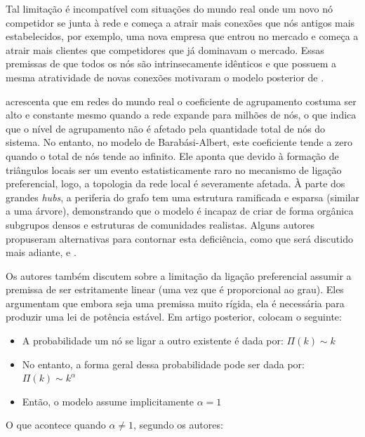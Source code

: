 \documentclass[12pt,oneside,a4paper,brazil,sumario=tradicional]{abntex2}
\begin{document}
Tal limitação é incompatível com situações do mundo real onde um novo nó competidor se junta à rede e começa a atrair mais conexões que nós antigos mais estabelecidos, por exemplo, uma nova empresa que entrou no mercado e começa a atrair mais clientes que competidores que já dominavam o mercado. Essas premissas de que todos os nós são intrinsecamente idênticos e que possuem a mesma atratividade de novas conexões motivaram o modelo posterior de \textcite{bianconi2001}.

\textcite{newman2003} acrescenta que em redes do mundo real o coeficiente de agrupamento costuma ser alto e constante mesmo quando a rede expande para milhões de nós, o que indica que o nível de agrupamento não é afetado pela quantidade total de nós do sistema. No entanto, no modelo de Barabási-Albert, este coeficiente tende a zero quando o total de nós tende ao infinito. Ele aponta que devido à formação de triângulos locais ser um evento estatisticamente raro no mecanismo de ligação preferencial, logo, a topologia da rede local é severamente afetada. À parte dos grandes \textit{hubs}, a periferia do grafo tem uma estrutura ramificada e esparsa (similar a uma árvore), demonstrando que o modelo é incapaz de criar de forma orgânica subgrupos densos e estruturas de comunidades realistas. Alguns autores propuseram alternativas para contornar esta deficiência, como \textcite{holme2002} que será discutido mais adiante, e \textcite{caldarelli2002}.

Os autores também discutem sobre a limitação da ligação preferencial assumir a premissa de ser estritamente linear (uma vez que é proporcional ao grau). Eles argumentam que embora seja uma premissa muito rígida, ela é necessária para produzir uma lei de potência estável. Em artigo posterior, \textcite{albert2002} colocam o seguinte:

\begin{itemize}
  \item A probabilidade um nó se ligar a outro existente é dada por: $\Pi(k) \sim k$
  \item No entanto, a forma geral dessa probabilidade pode ser dada por: $\Pi(k) \sim k^{\alpha}$
  \item Então, o modelo assume implicitamente $\alpha = 1$
\end{itemize}

O que acontece quando $\alpha \neq 1$, segundo os autores:
\end{document}
